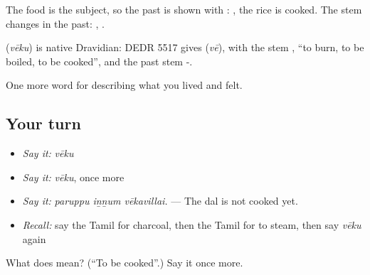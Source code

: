 The food is the subject, so the past is shown with :  , the rice is cooked. The stem changes in the past: , .

\begin{cousinweb}
\textbf{} (\emph{vēku}) is native Dravidian: DEDR 5517 gives  (\emph{vē}), with the stem , \textquotedblleft{}to burn, to be boiled, to be cooked\textquotedblright{}, and the past stem -.
\end{cousinweb}

\begin{grammarlens}[title={What you've built}]
One more word for describing what you lived and felt.
\end{grammarlens}

\subsection*{Your turn}
\begin{itemize}
\raggedright
  \item \emph{Say it:} \emph{vēku}
  \item \emph{Say it:} \emph{vēku}, once more
  \item \emph{Say it:} \emph{paruppu iṉṉum vēkavillai.} — The dal is not cooked yet.
  \item \emph{Recall:} say the Tamil for charcoal, then the Tamil for to steam, then say \emph{vēku} again
\end{itemize}

\begin{tcolorbox}[breakable,colback=teal!4,colframe=teal!35!black,title={Before you move on}]
What does  mean? (\textquotedblleft{}To be cooked\textquotedblright{}.) Say it once more.
\end{tcolorbox}
